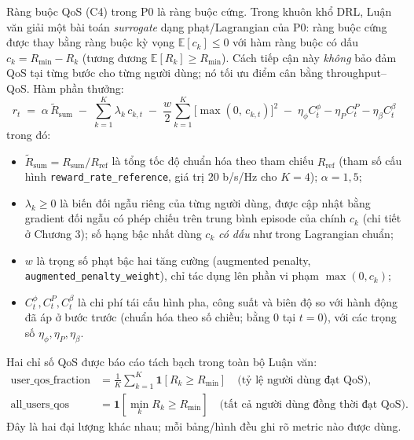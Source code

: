 Ràng buộc QoS (C4) trong P0 là ràng buộc cứng. Trong khuôn khổ DRL, Luận
văn giải một bài toán \emph{surrogate} dạng phạt/Lagrangian của P0: ràng
buộc cứng được thay bằng ràng buộc kỳ vọng
$\mathbb{E}[c_k] \leq 0$ với hàm ràng buộc có dấu
$c_k = R_{\min} - R_k$ (tương đương $\mathbb{E}[R_k] \geq R_{\min}$).
Cách tiếp cận này \emph{không} bảo đảm QoS tại từng bước cho từng người
dùng; nó tối ưu điểm cân bằng throughput--QoS. Hàm phần thưởng:
\begin{equation}
\boxed{
r_t \;=\; \alpha\,\tilde R_{\text{sum}}
       \;-\; \sum_{k=1}^{K} \lambda_k\, c_{k,t}
       \;-\; \frac{w}{2} \sum_{k=1}^{K} \big[\max(0,\, c_{k,t})\big]^2
       \;-\; \eta_{\phi} C^{\phi}_t - \eta_{P} C^{P}_t - \eta_{\beta} C^{\beta}_t
}
\label{eq:reward}
\end{equation}
trong đó:
\begin{itemize}[leftmargin=*]
\item $\tilde R_{\text{sum}} = R_{\text{sum}}/R_{\text{ref}}$ là tổng tốc
độ chuẩn hóa theo tham chiếu $R_{\text{ref}}$ (tham số cấu hình
\texttt{reward\_rate\_reference}, giá trị $20$ b/s/Hz cho $K=4$);
$\alpha=1{,}5$;
\item $\lambda_k \geq 0$ là biến đối ngẫu riêng của từng người dùng, được
cập nhật bằng gradient đối ngẫu có phép chiếu trên trung bình episode
của chính $c_k$ (chi tiết ở Chương 3); số hạng bậc nhất dùng $c_k$
\emph{có dấu} như trong Lagrangian chuẩn;
\item $w$ là trọng số phạt bậc hai tăng cường (augmented penalty,
\texttt{augmented\_penalty\_weight}), chỉ tác dụng lên phần vi phạm
$\max(0, c_k)$;
\item $C^{\phi}_t, C^{P}_t, C^{\beta}_t$ là chi phí tái cấu hình pha,
công suất và biên độ so với hành động đã áp ở bước trước (chuẩn hóa
theo số chiều; bằng $0$ tại $t=0$), với các trọng số
$\eta_{\phi}, \eta_{P}, \eta_{\beta}$.
\end{itemize}
Hai chỉ số QoS được báo cáo tách bạch trong toàn bộ Luận văn:
\begin{align}
\text{user\_qos\_fraction} &= \frac{1}{K}\sum_{k=1}^{K}
\mathbf{1}\!\left[R_k \geq R_{\min}\right]
\quad\text{(tỷ lệ người dùng đạt QoS)},
\label{eq:user_qos_fraction}\\
\text{all\_users\_qos} &= \mathbf{1}\!\left[\min_k R_k \geq R_{\min}\right]
\quad\text{(tất cả người dùng đồng thời đạt QoS)}.
\label{eq:all_users_qos}
\end{align}
Đây là hai đại lượng khác nhau; mỗi bảng/hình đều ghi rõ metric nào
được dùng.

